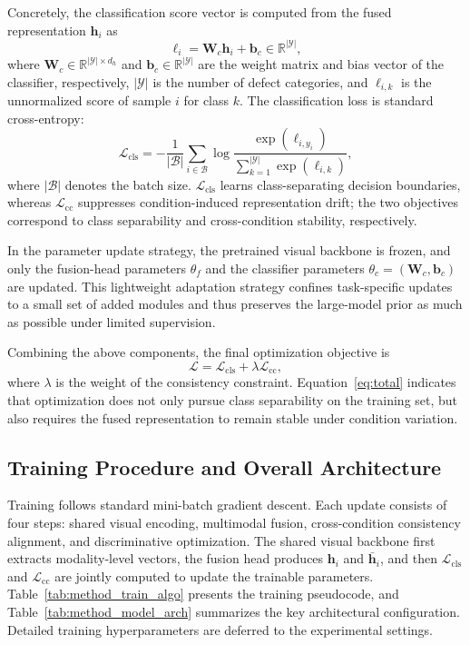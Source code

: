 \documentclass[journal]{IEEEtran}
\begin{document}
Concretely, the classification score vector is computed from the fused representation $\mathbf{h}_i$ as
\begin{equation}
\boldsymbol{\ell}_i = \mathbf{W}_c \mathbf{h}_i + \mathbf{b}_c \in \mathbb{R}^{|\mathcal{Y}|},
\label{eq:scores}
\end{equation}
where $\mathbf{W}_c \in \mathbb{R}^{|\mathcal{Y}| \times d_h}$ and $\mathbf{b}_c \in \mathbb{R}^{|\mathcal{Y}|}$ are the weight matrix and bias vector of the classifier, respectively, $|\mathcal{Y}|$ is the number of defect categories, and $\ell_{i,k}$ is the unnormalized score of sample $i$ for class $k$. The classification loss is standard cross-entropy:
\begin{equation}
\mathcal{L}_{\mathrm{cls}} =
-\frac{1}{|\mathcal{B}|}\sum_{i \in \mathcal{B}}
\log
\frac{\exp(\ell_{i,y_i})}{\sum_{k=1}^{|\mathcal{Y}|}\exp(\ell_{i,k})},
\label{eq:ce}
\end{equation}
where $|\mathcal{B}|$ denotes the batch size. $\mathcal{L}_{\mathrm{cls}}$ learns class-separating decision boundaries, whereas $\mathcal{L}_{\mathrm{cc}}$ suppresses condition-induced representation drift; the two objectives correspond to class separability and cross-condition stability, respectively.

In the parameter update strategy, the pretrained visual backbone is frozen, and only the fusion-head parameters $\theta_f$ and the classifier parameters $\theta_c=(\mathbf{W}_c,\mathbf{b}_c)$ are updated. This lightweight adaptation strategy confines task-specific updates to a small set of added modules and thus preserves the large-model prior as much as possible under limited supervision.

Combining the above components, the final optimization objective is
\begin{equation}
\mathcal{L} = \mathcal{L}_{\mathrm{cls}} + \lambda \mathcal{L}_{\mathrm{cc}},
\label{eq:total}
\end{equation}
where $\lambda$ is the weight of the consistency constraint. Equation~\eqref{eq:total} indicates that optimization does not only pursue class separability on the training set, but also requires the fused representation to remain stable under condition variation.

\subsection{Training Procedure and Overall Architecture}

Training follows standard mini-batch gradient descent. Each update consists of four steps: shared visual encoding, multimodal fusion, cross-condition consistency alignment, and discriminative optimization. The shared visual backbone first extracts modality-level vectors, the fusion head produces $\mathbf{h}_i$ and $\bar{\mathbf{h}}_i$, and then $\mathcal{L}_{\mathrm{cls}}$ and $\mathcal{L}_{\mathrm{cc}}$ are jointly computed to update the trainable parameters. Table~\ref{tab:method_train_algo} presents the training pseudocode, and Table~\ref{tab:method_model_arch} summarizes the key architectural configuration. Detailed training hyperparameters are deferred to the experimental settings.
\end{document}

